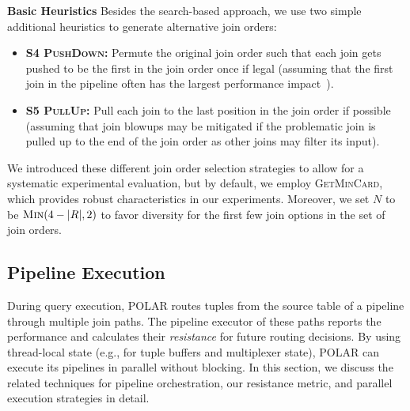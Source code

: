 \textbf{Basic Heuristics}
Besides the search-based approach, we use two simple additional heuristics to generate alternative join orders: 
\begin{itemize}
\item \textbf{S4 \textsc{PushDown}:} Permute the original join order such that each join gets pushed to be the first in the join order once if legal (assuming that the first join in the pipeline often has the largest performance impact~\cite{DBLP:conf/damon/SchubertGZM23}).
\item \textbf{S5 \textsc{PullUp}:} Pull each join to the last position in the join order if possible (assuming that join blowups may be mitigated if the problematic join is pulled up to the end of the join order as other joins may filter its input).
\end{itemize}
We introduced these different join order selection strategies to allow for a systematic experimental evaluation, but by default, we employ \textsc{GetMinCard}, which provides robust characteristics in our experiments. Moreover, we set $N$ to be $\textsc{Min}(4 - \lvert R\rvert, 2)$ to favor diversity for the first few join options in the set of join orders.

\subsection{Pipeline Execution}\label{sec:execution}

During query execution, POLAR routes tuples from the source table of a pipeline through multiple join paths. The pipeline executor of these paths reports the performance and calculates their \emph{resistance} for future routing decisions. By using thread-local state (e.g., for tuple buffers and multiplexer state), POLAR can execute its pipelines in parallel without blocking. In this section, we discuss the related techniques for pipeline orchestration, our resistance metric, and parallel execution strategies in detail.

